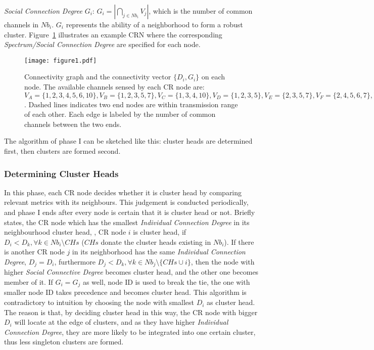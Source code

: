 \textit{Social Connection Degree} $G_i$: $G_i=|\bigcap_{j\in Nb_i}V_j|$, which is the number of common channels in $Nb_i$. $G_i$ represents the ability of a neighborhood to form a robust cluster. Figure~\ref{fig1} illustrates an example CRN where the corresponding \textit{Spectrum/Social Connection Degree} are specified for each node.
\begin{figure}[ht!]
  \centering
\texttt{[image: figure1.pdf]}
	\caption{Connectivity graph and the connectivity vector $\{D_i, G_i\}$ on each node. The available channels sensed by each CR node are: $V_A=\{1,2,3,4,5,6,10\}, V_B=\{1,2,3,5,7\}, V_C=\{1,3,4,10\}, V_D=\{1,2,3,5\}, V_E=\{2,3,5,7\}, V_F=\{2,4,5,6,7\}, V_G=\{1,2,3,4,8\}, V_H=\{1,2,5,8\}$. Dashed lines indicates two end nodes are within transmission range of each other. Each edge is labeled by the number of common channels between the two ends.}
	\label{fig1}
\end{figure}

The algorithm of phase I can be sketched like this: cluster heads are determined first, then clusters are formed second.

\subsubsection{Determining Cluster Heads}
In this phase, each CR node decides whether it is cluster head by comparing relevant metrics with its neighbours.
This judgement is conducted periodically, and phase I ends after every node is certain that it is cluster head or not.
Briefly states, the CR node which has the smallest \textit{Individual Connection Degree} in its neighbourhood cluster head, \ie, CR node $i$ is cluster head, if $D_i<D_k, \forall k\in Nb_i\setminus CHs$ ($CHs$ donate the cluster heads existing in $Nb_i$).
If there is another CR node $j$ in its neighborhood has the same \textit{Individual Connection Degree}, \ie $D_j = D_i$, furthermore $D_j < D_{k}, \forall k\in Nb_j\setminus \{CHs\cup i\}$, then the node with higher \textit{Social Connective Degree} becomes cluster head, and the other one becomes member of it. 
If $G_i = G_j$ as well, node ID is used to break the tie, \ie the one with smaller node ID takes precedence and becomes cluster head.
This algorithm is contradictory to intuition by choosing the node with smallest $D_i$ as cluster head.
The reason is that, by deciding cluster head in this way, the CR node with bigger $D_i$ will locate at the edge of clusters, and as they have higher \textit{Individual Connection Degree}, they are more likely to be integrated into one certain cluster, thus less singleton clusters are formed.


